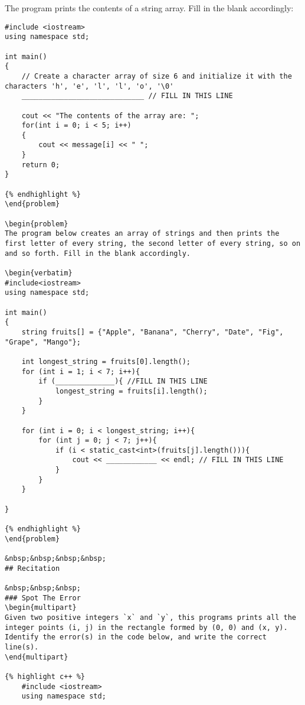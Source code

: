 \begin{problem}
    The program prints the contents of a string array. Fill in the blank accordingly:

    \begin{verbatim}
#include <iostream>
using namespace std;

int main()
{
    // Create a character array of size 6 and initialize it with the characters 'h', 'e', 'l', 'l', 'o', '\0'
    _____________________________ // FILL IN THIS LINE

    cout << "The contents of the array are: ";
    for(int i = 0; i < 5; i++)
    {
        cout << message[i] << " ";
    }
    return 0; 
}

{% endhighlight %}
\end{problem}

\begin{problem}
The program below creates an array of strings and then prints the first letter of every string, the second letter of every string, so on and so forth. Fill in the blank accordingly.

\begin{verbatim}
#include<iostream>
using namespace std;

int main()
{
    string fruits[] = {"Apple", "Banana", "Cherry", "Date", "Fig", "Grape", "Mango"};

    int longest_string = fruits[0].length();
    for (int i = 1; i < 7; i++){
        if (______________){ //FILL IN THIS LINE
            longest_string = fruits[i].length();
        }
    }

    for (int i = 0; i < longest_string; i++){
        for (int j = 0; j < 7; j++){ 
            if (i < static_cast<int>(fruits[j].length())){
                cout << ____________ << endl; // FILL IN THIS LINE
            }
        }
    }

}

{% endhighlight %}
\end{problem}

&nbsp;&nbsp;&nbsp;&nbsp;
## Recitation

&nbsp;&nbsp;&nbsp;
### Spot The Error
\begin{multipart}
Given two positive integers `x` and `y`, this programs prints all the integer points (i, j) in the rectangle formed by (0, 0) and (x, y). Identify the error(s) in the code below, and write the correct line(s).
\end{multipart}

{% highlight c++ %}
    #include <iostream>
    using namespace std;
    

\end{verbatim}
\end{problem}
